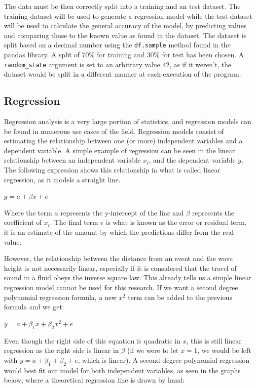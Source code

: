 \documentclass[11pt,letterpaper]{article}
\begin{document}
The data must be then correctly split into a training and an test dataset. The training 
dataset will be used to generate a regression model while the test dataset will 
be used to calculate the general accuracy of the model, by predicting values and 
comparing those to the known value as found in the dataset. The dataset is split based on 
a decimal number using the \verb|df.sample| method found in the pandas library. A split 
of 70\% for training and 30\% for test has been chosen. A \verb|random_state| argument is 
set to an arbitrary value 42, as if it weren't, the dataset would be split in a different 
manner at each execution of the program. 

\subsection{Regression}

Regression analysis is a very large portion of statistics, and regression models can 
be found in numerous use cases of the field. Regression models consist of estimating the 
relationship between one (or more) independent variables and a dependent variable. A 
simple example of regression can be seen in the linear relationship between an independent 
variable $x_{i}$, and the dependent variable $y$. The following expression shows this relationship in what is 
called linear regression, as it models a straight line. 

$y = a + \beta x + e $

Where the term $a$ represents the y-intercept of the line and $\beta$ represents the 
coefficient of $x_i$. The final term $e$ is what is known as the error or residual 
term, it is an estimate of the amount by which the predictions differ from the real 
value. 

However, the relationship between the distance from an event and the wave height 
is not necessarily linear, especially if it is considered that the travel of 
sound in a fluid obeys the inverse square law. This already tells us a simple 
linear regression model cannot be used for this research. If we want a second degree 
polynomial regression formula, a new $x^2$ term can be added to the previous formula 
and we get: 

$y = a + \beta_1 x + \beta_2 x^2 + e$

Even though the right side of this equation is quadratic in $x$, this is still 
linear regression as the right side is linear in $\beta$ (if we were to let 
$x = 1$, we would be left with $y = a + \beta_1 + \beta_2 + e$, which is linear). 
A second degree polynomial regression would best fit our model for both independent 
variables, as seen in the graphs below, where a theoretical regression line is drawn 
by hand:
\end{document}
